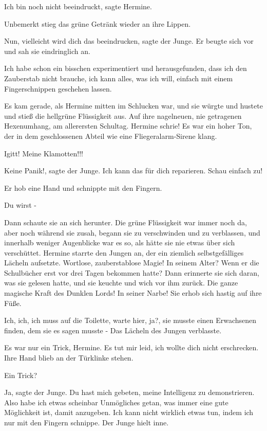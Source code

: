 \glqq Ich bin noch nicht beeindruckt\grqq{}, sagte Hermine.

Unbemerkt stieg das grüne Getränk wieder an ihre Lippen.

\glqq Nun, vielleicht wird dich das beeindrucken\grqq{}, sagte der Junge. Er
beugte sich vor und sah sie eindringlich an.

\glqq Ich habe schon ein bisschen experimentiert und herausgefunden, dass ich
den Zauberstab nicht brauche, ich kann alles, was ich will, einfach mit einem
Fingerschnippen geschehen lassen.\grqq{}

Es kam gerade, als Hermine mitten im Schlucken war, und sie würgte und hustete
und stieß die hellgrüne Flüssigkeit aus. Auf ihre nagelneuen, nie getragenen
Hexenumhang, am allerersten Schultag. Hermine schrie! Es war ein hoher Ton, der
in dem geschlossenen Abteil wie eine Fliegeralarm-Sirene klang.

\glqq Igitt! Meine Klamotten!!!\grqq{}

\glqq Keine Panik!\grqq{}, sagte der Junge. \glqq Ich kann das für dich
reparieren. Schau einfach zu!\grqq{}

Er hob eine Hand und schnippte mit den Fingern.

\glqq Du wirst -\grqq{}

Dann schaute sie an sich herunter. Die grüne Flüssigkeit war immer noch da, aber
noch während sie zusah, begann sie zu verschwinden und zu verblassen, und
innerhalb weniger Augenblicke war es so, als hätte sie nie etwas über sich
verschüttet. Hermine starrte den Jungen an, der ein ziemlich selbstgefälliges
Lächeln aufsetzte. Wortlose, zauberstablose Magie! In seinem Alter? Wenn er die
Schulbücher erst vor drei Tagen bekommen hatte? Dann erinnerte sie sich daran,
was sie gelesen hatte, und sie keuchte und wich vor ihm zurück. Die ganze
magische Kraft des Dunklen Lords! In seiner Narbe! Sie erhob sich hastig auf
ihre Füße.

\glqq Ich, ich, ich muss auf die Toilette, warte hier, ja?\grqq{}, sie musste
einen Erwachsenen finden, dem sie es sagen musste - Das Lächeln des Jungen
verblasste.

\glqq Es war nur ein Trick, Hermine. Es tut mir leid, ich wollte dich nicht
erschrecken.\grqq{} Ihre Hand blieb an der Türklinke stehen.

\glqq Ein Trick?\grqq{}

\glqq Ja\grqq{}, sagte der Junge. \glqq Du hast mich gebeten, meine Intelligenz
zu demonstrieren. Also habe ich etwas scheinbar Unmögliches getan, was immer
eine gute Möglichkeit ist, damit anzugeben. Ich kann nicht wirklich etwas tun,
indem ich nur mit den Fingern schnippe.\grqq{} Der Junge hielt inne.

